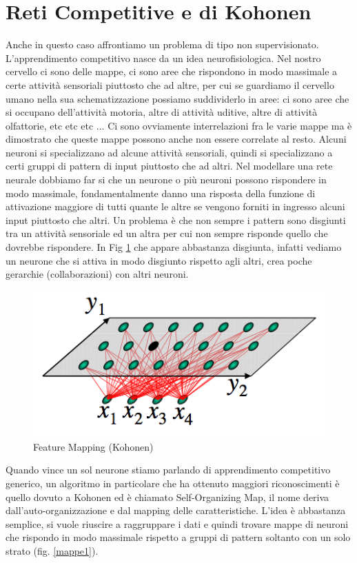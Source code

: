 \section{Reti Competitive e di Kohonen}
Anche in questo caso affrontiamo un problema di tipo non supervisionato. L'apprendimento competitivo nasce da un idea neurofisiologica. Nel nostro cervello ci sono delle mappe, ci sono aree che rispondono in modo massimale a certe attività sensoriali piuttosto che ad altre, per cui se guardiamo il cervello umano nella sua schematizzazione possiamo suddividerlo in aree: ci sono aree che si occupano dell'attività motoria, altre di attività uditive, altre di attività olfattorie, etc etc etc ...  Ci sono ovviamente interrelazioni fra le varie mappe ma è dimostrato che queste mappe possono anche non essere correlate al resto. Alcuni neuroni si specializzano ad alcune attività sensoriali, quindi si specializzano a certi gruppi di pattern di input piuttosto che ad altri. Nel modellare una rete neurale dobbiamo far si che un neurone o più neuroni possono rispondere in modo massimale, fondamentalmente danno una risposta della funzione di attivazione maggiore di tutti quante le altre se vengono forniti in ingresso alcuni input piuttosto che altri. Un problema è che non sempre i pattern sono disgiunti tra un attività sensoriale ed un altra per cui non sempre risponde quello che dovrebbe rispondere. In Fig \ref{mappa} che appare abbastanza disgiunta, infatti vediamo un neurone che si attiva in modo disgiunto rispetto agli altri, crea poche gerarchie (collaborazioni) con altri neuroni.
\begin{figure}
\centering
\includegraphics[scale=0.5]{img/rete.png}
\caption{Feature Mapping (Kohonen)}
\label{mappa}
\end{figure}
Quando vince un sol neurone stiamo parlando di apprendimento competitivo generico, un algoritmo in particolare che ha ottenuto maggiori riconoscimenti è quello dovuto a Kohonen ed è chiamato Self-Organizing Map,  il nome deriva dall'auto-organizzazione e dal mapping delle caratteristiche. L'idea è abbastanza semplice, si vuole riuscire a raggruppare i dati e quindi trovare mappe di neuroni che rispondo in modo massimale rispetto a gruppi di pattern soltanto con un solo strato (fig. \ref{mappe1}).
